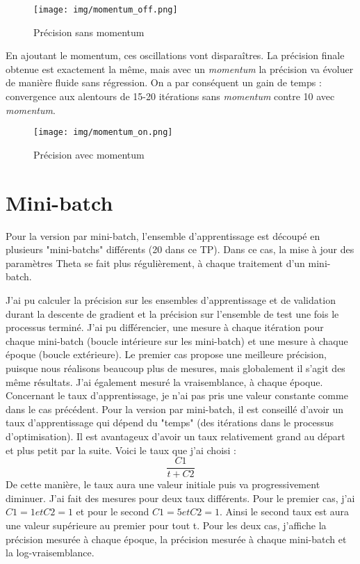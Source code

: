 \documentclass[12pt]{article}
\begin{document}
\begin{figure}[H]
\begin{center}
	\texttt{[image: img/momentum\_off.png]}
	\caption{Précision sans momentum}
\end{center}
\end{figure}

En ajoutant le momentum, ces oscillations vont disparaîtres. La précision finale obtenue est exactement la même, mais avec un \textit{momentum} la précision va évoluer de manière fluide sans régression. On a par conséquent un gain de temps : convergence aux alentours de 15-20 itérations sans \textit{momentum} contre 10 avec \textit{momentum}.
\begin{figure}[H]
\begin{center}
	\texttt{[image: img/momentum\_on.png]}
	\caption{Précision avec momentum}
\end{center}
\end{figure}


\section{Mini-batch}
Pour la version par mini-batch, l'ensemble d'apprentissage est découpé en plusieurs "mini-batchs" différents (20 dans ce TP). Dans ce cas, la mise à jour des paramètres Theta se fait plus régulièrement, à chaque traitement d'un mini-batch. 

J'ai pu calculer la précision sur les ensembles d'apprentissage et de validation durant la descente de gradient et la précision sur l'ensemble de test une fois le processus terminé. J'ai pu différencier, une mesure à chaque itération pour chaque mini-batch (boucle intérieure sur les mini-batch) et une mesure à chaque époque (boucle extérieure). Le premier cas propose une meilleure précision, puisque nous réalisons beaucoup plus de mesures, mais globalement il s'agit des même résultats.
J'ai également mesuré la vraisemblance, à chaque époque.\\

Concernant le taux d'apprentissage, je n'ai pas pris une valeur constante comme dans le cas précédent. Pour la version par mini-batch, il est conseillé d'avoir un taux d'apprentissage qui dépend du "temps" (des itérations dans le processus d'optimisation). Il est avantageux d'avoir un taux relativement grand au départ et plus petit par la suite. Voici le taux que j'ai choisi : 
\[\frac{C1}{t+C2}\]
De cette manière, le taux aura une valeur initiale puis va progressivement diminuer. J'ai fait des mesures pour deux taux différents. Pour le premier cas, j'ai $C1 = 1 et C2 = 1$ et pour le second $C1 = 5 et C2 = 1$. Ainsi le second taux est aura une valeur supérieure au premier pour tout t.
Pour les deux cas, j'affiche la précision mesurée à chaque époque, la précision mesurée à chaque mini-batch et la log-vraisemblance.
\end{document}
